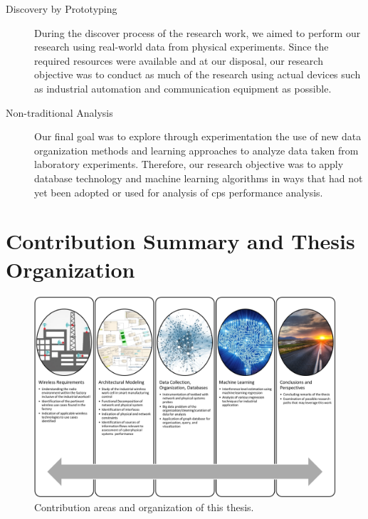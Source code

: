 {\begin{description}
	\item[Discovery by Prototyping] During the discover process of the research work, we aimed to perform our research using real-world data from physical experiments.  Since the required resources were available and at our disposal, our research objective was to conduct as much of the research using actual devices such as industrial automation and communication equipment as possible.
	
	\item[Non-traditional Analysis] Our final goal was to explore through experimentation the use of new data organization methods and learning approaches to analyze data taken from laboratory experiments.  Therefore, our research objective was to apply database technology and machine learning algorithms in ways that had not yet been adopted or used for analysis of \gls{cps} performance analysis.
	
\end{description}

}

\section{Contribution Summary and Thesis Organization}

\begin{figure}[!tbhp]
	\includegraphics{chapter-intro/images/contributions}
	\caption{Contribution areas and organization of this thesis.}
	\label{fig:intro:contr-org}
\end{figure}

